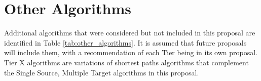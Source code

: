 \begin{comment}
\section{Operators}
\subsection{Degree}

\subsection{Join}

\subsection{Relabel}

\subsection{Sort}

\andrew{Need to be able to sort edge lists along source or target column as well as to sort lists of neighbors in an adjacency list.  The former is necessary for efficiently building CSR from an edge list.  The second is necessary for preconditions on various algorithms.}
\subsection{Transpose}


\andrew{I've used NetworkX as inspiration for organization.  Oddly, NetworkX only has DFS as an adaptor (view).}
\end{comment}


\chapter{Other Algorithms}

Additional algorithms that were considered but not included in this proposal are identified in Table \ref{tab:other_algorithms}. 
It is assumed that future proposals will include them, with a recommendation of each Tier being in its own proposal.
Tier X algorithms are variations of shortest paths algorithms that complement the Single Source, Multiple Target algorithms 
in this proposal.


